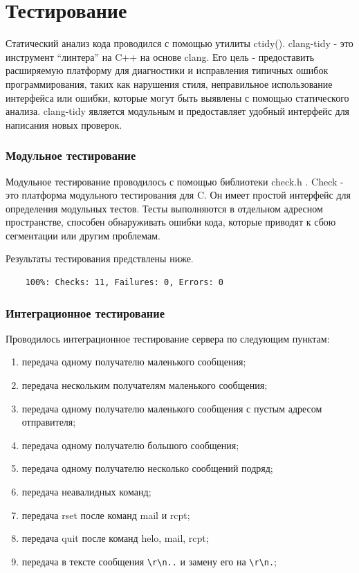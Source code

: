 \documentclass[a4paper,12pt]{report}
\begin{document}
\newpage


\section{Тестирование}
Статический анализ кода проводился с помощью утилиты ctidy(\cite{ctidy}). clang-tidy - это инструмент “линтера” на C++ на основе clang. Его цель - предоставить расширяемую платформу для диагностики и исправления типичных ошибок программирования, таких как нарушения стиля, неправильное использование интерфейса или ошибки, которые могут быть выявлены с помощью статического анализа. clang-tidy является модульным и предоставляет удобный интерфейс для написания новых проверок.

\subsubsection{Модульное тестирование}
 
 Модульное тестирование проводилось с помощью библиотеки check.h \cite{check}. Check - это платформа модульного тестирования для C. Он имеет простой интерфейс для определения модульных тестов. Тесты выполняются в отдельном адресном пространстве, способен обнаруживать ошибки кода, которые приводят к сбою сегментации или другим проблемам. 
 
 Результаты тестирования предствлены ниже.
\begin{verbatim}
    100%: Checks: 11, Failures: 0, Errors: 0
\end{verbatim}
 
\subsubsection{Интеграционное тестирование}

Проводилось интеграционное тестирование сервера по следующим пунктам:
\begin{enumerate}
	\item передача одному получателю маленького сообщения;
	\item передача нескольким получателям маленького сообщения;
	\item передача одному получателю маленького сообщения с пустым адресом отправителя;
    \item передача одному получателю большого сообщения;
    \item передача одному получателю несколько сообщений подряд;
    \item передача неавалидных команд;
    \item передача rset после команд mail и rcpt;
    \item передача quit после команд helo, mail, rcpt;
    \item передача в тексте сообщения \texttt{\textbackslash{}r\textbackslash{}n..} и замену его на \texttt{\textbackslash{}r\textbackslash{}n.};
\end{enumerate}
\end{document}
